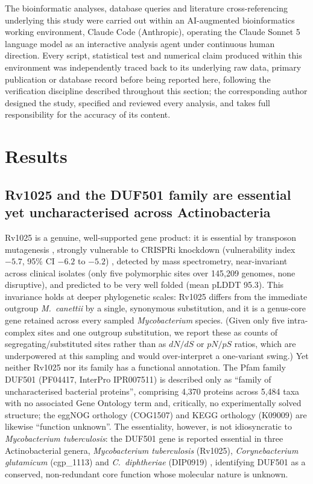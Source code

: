\documentclass[11pt,a4paper]{article}
\newcommand{\mtb}{\textit{Mycobacterium tuberculosis}}
\begin{document}
The bioinformatic analyses, database queries and literature cross-referencing underlying this study were carried out within an AI-augmented bioinformatics working environment, Claude Code (Anthropic), operating the Claude Sonnet 5 language model as an interactive analysis agent under continuous human direction. Every script, statistical test and numerical claim produced within this environment was independently traced back to its underlying raw data, primary publication or database record before being reported here, following the verification discipline described throughout this section; the corresponding author designed the study, specified and reviewed every analysis, and takes full responsibility for the accuracy of its content.

\section{Results}

\subsection{Rv1025 and the DUF501 family are essential yet uncharacterised across Actinobacteria}

Rv1025 is a genuine, well-supported gene product: it is essential by transposon mutagenesis \citep{dejesus2017essentiality}, strongly vulnerable to CRISPRi knockdown (vulnerability index $-5.7$, 95\% CI $-6.2$ to $-5.2$) \citep{bosch2021vulnerability}, detected by mass spectrometry, near-invariant across clinical isolates (only five polymorphic sites over 145{,}209 genomes, none disruptive), and predicted to be very well folded (mean pLDDT 95.3). This invariance holds at deeper phylogenetic scales: Rv1025 differs from the immediate outgroup \textit{M.\ canettii} by a single, synonymous substitution, and it is a genus-core gene retained across every sampled \textit{Mycobacterium} species. (Given only five intra-complex sites and one outgroup substitution, we report these as counts of segregating/substituted sites rather than as $dN/dS$ or $pN/pS$ ratios, which are underpowered at this sampling and would over-interpret a one-variant swing.) Yet neither Rv1025 nor its family has a functional annotation. The Pfam family DUF501 (PF04417, InterPro IPR007511) is described only as ``family of uncharacterised bacterial proteins'', comprising 4{,}370 proteins across 5{,}484 taxa with no associated Gene Ontology term and, critically, no experimentally solved structure; the eggNOG orthology (COG1507) and KEGG orthology (K09009) are likewise ``function unknown''. The essentiality, however, is not idiosyncratic to \mtb{}: the DUF501 gene is reported essential in three Actinobacterial genera, \mtb{} (Rv1025), \textit{Corynebacterium glutamicum} (cgp\_1113) and \textit{C.\ diphtheriae} (DIP0919) \citep{goodall2023diphtheriae}, identifying DUF501 as a conserved, non-redundant core function whose molecular nature is unknown.
\end{document}
